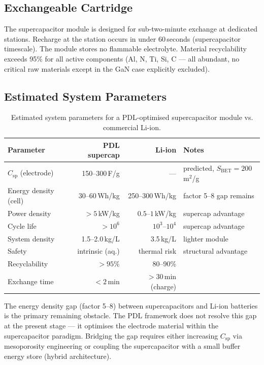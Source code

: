 \documentclass[11pt,a4paper]{article}
\newcommand{\Csp}{C_{\mathrm{sp}}}
\newcommand{\SBET}{S_{\mathrm{BET}}}
\begin{document}
\subsection{Exchangeable Cartridge}

The supercapacitor module is designed for sub-two-minute exchange at dedicated stations. Recharge at the station occurs in under 60\,seconds (supercapacitor timescale). The module stores no flammable electrolyte. Material recyclability exceeds 95\% for all active components (Al, N, Ti, Si, C — all abundant, no critical raw materials except in the GaN case explicitly excluded).

\subsection{Estimated System Parameters}

\begin{table}[ht]
\centering
\caption{Estimated system parameters for a PDL-optimised supercapacitor module vs. commercial Li-ion.}
\label{tab:system}
\begin{tabular}{lrrl}
\toprule
Parameter & PDL supercap & Li-ion & Notes \\
\midrule
$\Csp$ (electrode) & 150--300\,F/g & — & predicted, $\SBET = 200$\,m$^2$/g \\
Energy density (cell) & 30--60\,Wh/kg & 250--300\,Wh/kg & factor 5--8 gap remains \\
Power density & $>5$\,kW/kg & $0.5$--$1$\,kW/kg & supercap advantage \\
Cycle life & $>10^6$ & $10^3$--$10^4$ & supercap advantage \\
System density & 1.5--2.0\,kg/L & 3.5\,kg/L & lighter module \\
Safety & intrinsic (aq.) & thermal risk & structural advantage \\
Recyclability & $>95\%$ & 80--90\% & \\
Exchange time & $<2$\,min & $>30$\,min (charge) & \\
\bottomrule
\end{tabular}
\end{table}

\begin{remark}
The energy density gap (factor 5--8) between supercapacitors and Li-ion batteries is the primary remaining obstacle. The PDL framework does not resolve this gap at the present stage — it optimises the electrode material within the supercapacitor paradigm. Bridging the gap requires either increasing $\Csp$ via mesoporosity engineering or coupling the supercapacitor with a small buffer energy store (hybrid architecture).
\end{remark}
\end{document}

